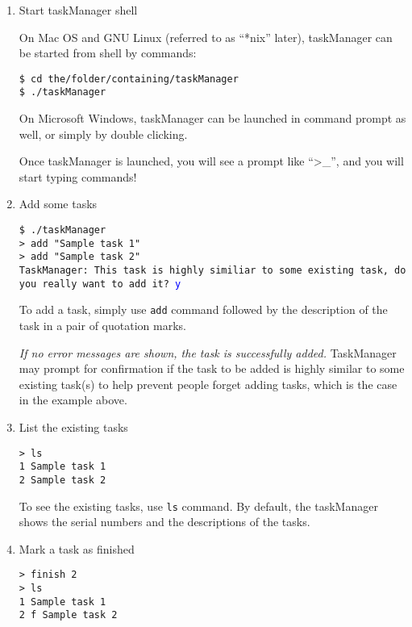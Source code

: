 \documentclass[12pt, a4paper]{article}
\begin{document}
\begin{enumerate}
\item Start taskManager shell

On Mac OS and GNU Linux (referred to as ``*nix'' later), taskManager can be started from shell by commands:

\texttt{\$ cd the/folder/containing/taskManager\\
  \$ ./taskManager \footnotemark}

On Microsoft Windows, taskManager can be launched in command prompt as well, or simply by double clicking.

Once taskManager is launched, you will see a prompt like ``\textgreater\_'', and you will start typing commands!


\item Add some tasks

\texttt{\$ ./taskManager\\
  \textgreater \  add "Sample task 1"\\
  \textgreater \  add "Sample task 2"\\
  TaskManager: This task is highly similiar to some existing task, do you really want to add it? \textcolor{blue}{y}}

To add a task, simply use \texttt{add} command followed by the description of the task in a pair of quotation marks.

\emph{If no error messages are shown, the task is successfully added.}
TaskManager may prompt for confirmation if the task to be added is highly similar to some existing task(s) to help prevent people forget adding tasks, which is the case in the example above.

\item List the existing tasks

\texttt{\textgreater \ ls\\
  1   Sample task 1\\
  2   Sample task 2}

To see the existing tasks, use \texttt{ls} command. By default, the taskManager shows the serial numbers and the descriptions of the tasks.

\item Mark a task as finished

\texttt{\textgreater \ finish 2\\
  \textgreater \ ls\\
  1   Sample task 1\\
  2 f Sample task 2}
 

\end{enumerate}
\end{document}
